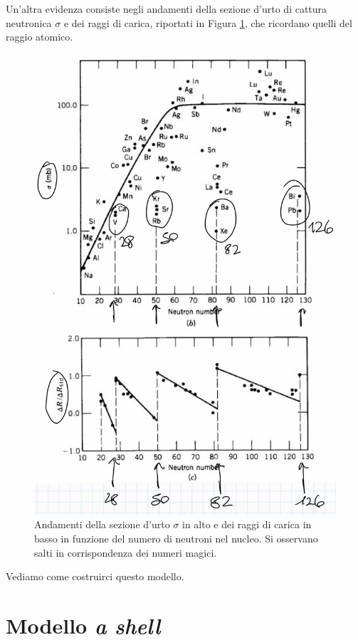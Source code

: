 \noindent Un'altra evidenza consiste negli andamenti della sezione d'urto di cattura neutronica $\sigma$ e dei raggi di carica, riportati in Figura \ref{sigmar}, che ricordano quelli del raggio atomico.

\begin{figure}[!h]
    \centering
    \includegraphics[scale=0.3]{Immagini/mag-num2.png}
    \caption{Andamenti della sezione d'urto $\sigma$ in alto e dei raggi di carica in basso in funzione del numero di neutroni nel nucleo. Si osservano salti in corrispondenza dei numeri magici.}
    \label{sigmar}
\end{figure}

\noindent Vediamo come costruirci questo modello.
\newpage
\section{Modello \textit{a shell}}
